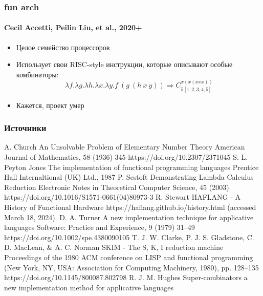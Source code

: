 \documentclass[aspectratio=169]{beamer}
\begin{document}
\begin{frame}
    \frametitle{fun arch}
    \framesubtitle{Cecil Accetti, Peilin Liu, et al., 2020+}

    \begin{itemize}
        \item Целое семейство процессоров
        \item Использует свои RISC-style инструкции, которые описывают особые комбинаторы:
              \[\lambda f. \lambda g. \lambda h. \lambda x. \lambda y.f\ (g\ (h\ x\ y)) \Rightarrow C^{x(x(xxx))}_{5[1,2,3,4,5]}\]
        \item Кажется, проект умер
    \end{itemize}

\end{frame}

\appendix
\begin{frame}[allowframebreaks]
    \frametitle{Источники}
    \begin{thebibliography}{}
        A. Church \newblock
        An Unsolvable Problem of Elementary Number Theory \newblock
        American Journal of Mathematics, 58 (1936) 345 \newblock
        https://doi.org/10.2307/2371045
        S. L. Peyton Jones \newblock
        The implementation of functional programming languages \newblock
        Prentice Hall Internaltional (UK) Ltd., 1987
        P. Sestoft \newblock
        Demonstrating Lambda Calculus Reduction \newblock
        Electronic Notes in Theoretical Computer Science, 45 (2003) \newblock
        https://doi.org/10.1016/S1571-0661(04)80973-3
        R. Stewart \newblock
        HAFLANG - A History of Functional Hardware \newblock
        https://haflang.github.io/history.html (accessed March 18, 2024).
        D. A. Turner \newblock
        A new implementation technique for applicative languages \newblock
        Software: Practice and Experience, 9 (1979) 31–49 \newblock
        https://doi.org/10.1002/spe.4380090105
        T. J. W. Clarke, P. J. S. Gladstone, C. D. MacLean, \& A. C. Norman \newblock
        SKIM - The S, K, I reduction machine \newblock
        Proceedings of the 1980 ACM conference on LISP and functional programming (New York, NY, USA: Association for Computing Machinery, 1980), pp. 128–135 \newblock
        https://doi.org/10.1145/800087.802798
        R. J. M. Hughes \newblock
        Super-combinators a new implementation method for applicative languages \newblock

\end{thebibliography}
\end{frame}
\end{document}
